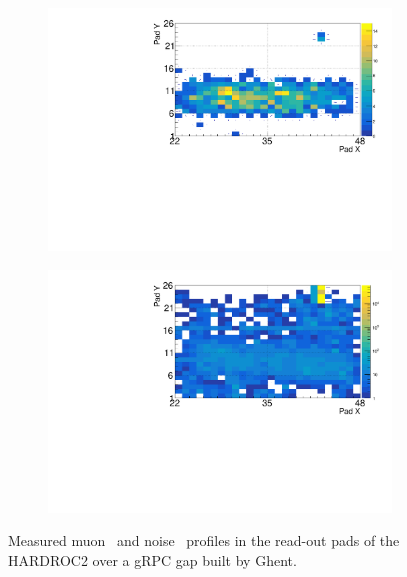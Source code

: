 	\begin{figure}[H]
		\begin{subfigure}{.5\linewidth}
		    \centering
			\includegraphics[width = \linewidth]{fig/chapt6/Muon-Profile-gRPC-HARDROC.pdf}
			\caption{\label{fig:HARDROC2-gRPC-profiles:A}}
		\end{subfigure}
		\begin{subfigure}{.5\linewidth}
		    \centering
			\includegraphics[width = \linewidth]{fig/chapt6/Noise-Profile-gRPC-HARDROC.pdf}
			\caption{\label{fig:HARDROC2-gRPC-profiles:B}}
		\end{subfigure}
		\caption{\label{fig:HARDROC2-gRPC-profiles} Measured muon~ and noise~ profiles in the read-out pads of the HARDROC2 over a gRPC gap built by Ghent.}
    \end{figure}
    
